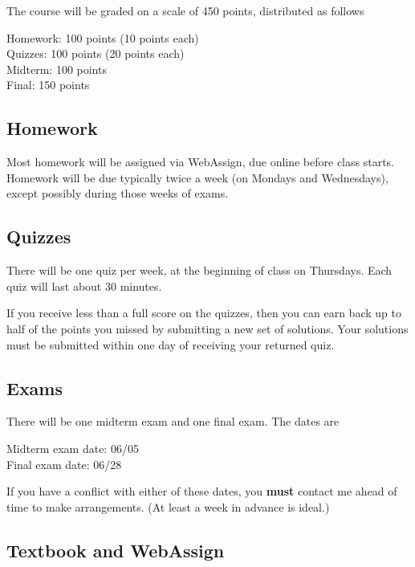 \documentclass{article}
\begin{document}
The course will be graded on a scale of 450 points, distributed as follows 

\vspace{3mm}


\noindent Homework: 100 points (10 points each)\\
Quizzes: 100 points (20 points each) \\
Midterm: 100 points \\
Final: 150 points



\subsection*{Homework}

Most homework will be assigned via WebAssign, due online before class starts. Homework will be due typically twice a week (on Mondays and Wednesdays), except possibly during those weeks of exams. 

\subsection*{Quizzes}

There will be one quiz per week, at the beginning of class on Thursdays. Each quiz will last about 30 minutes.  

If you receive less than a full score on the quizzes, then you can earn back up to half of the points you missed by submitting a new set of solutions. Your solutions must be submitted within one day of receiving your returned quiz.  

\subsection*{Exams}

There will be one midterm exam and one final exam. The dates are 

\vspace{3mm}

\noindent Midterm exam date: 06/05 \\
Final exam date: 06/28

\vspace{3mm}

\noindent If you have a conflict with either of these dates, you \textbf{must} contact me ahead of time to make arrangements. (At least a week in advance is ideal.) 


\subsection*{Textbook and WebAssign}
\end{document}

